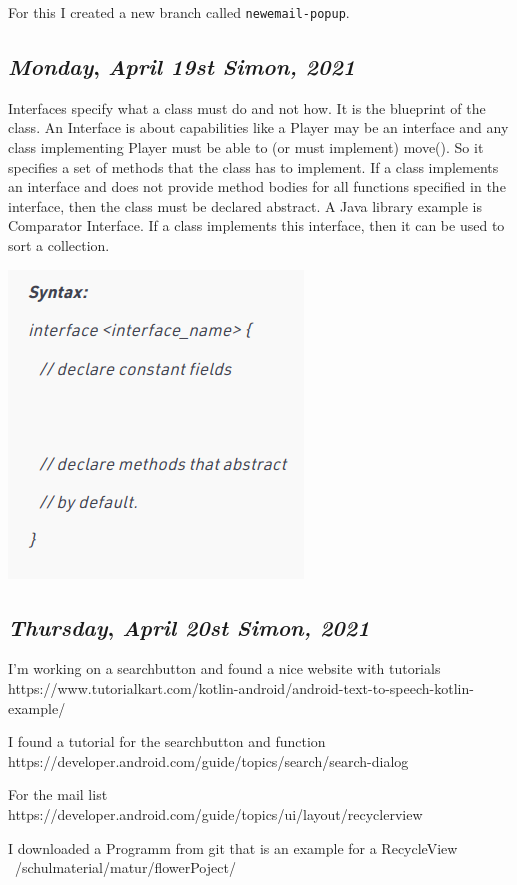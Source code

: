 For this I created a new branch called \texttt{newemail-popup}.


\endgroup
\newpage

\def\day{\textit{April 19st Simon, 2021}}
\def\weekday{\textit{Monday}}
\subsection*{\weekday, \day}
Interfaces specify what a class must do and not how. It is the blueprint of the class.
An Interface is about capabilities like a Player may be an interface and any class implementing Player must be able to (or must implement) move(). So it specifies a set of methods that the class has to implement.
If a class implements an interface and does not provide method bodies for all functions specified in the interface, then the class must be declared abstract.
A Java library example is Comparator Interface. If a class implements this interface, then it can be used to sort a collection.

\includegraphics[width=.4\textwidth]{media/SyntactsInterface.png}


\def\day{\textit{April 20st Simon, 2021}}
\def\weekday{\textit{Thursday}}
\subsection*{\weekday, \day}

I'm working on a searchbutton and found a nice website with tutorials
https://www.tutorialkart.com/kotlin-android/android-text-to-speech-kotlin-example/

I found a tutorial for the searchbutton and function
https://developer.android.com/guide/topics/search/search-dialog

For the mail list
https://developer.android.com/guide/topics/ui/layout/recyclerview

I downloaded a Programm from git that is an example for a RecycleView
~/schulmaterial/matur/flowerPoject/




